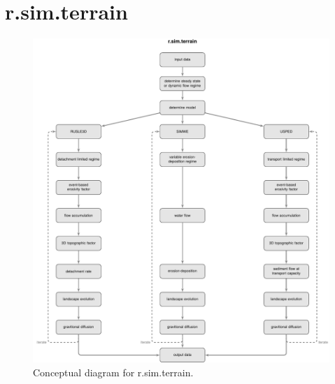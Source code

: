 \documentclass[gmd, manuscript]{copernicus}
\providecommand{\DIFadd}[1]{{\protect\color{blue} \sf #1}} %
\providecommand{\DIFaddbegin}{} %
\providecommand{\DIFaddFL}[1]{\DIFadd{#1}} %
\begin{document}
\section{r.sim.terrain}
\DIFaddbegin 


\begin{figure}%
\center
\includegraphics[width=\textwidth,keepaspectratio]{figures/concept.pdf}
\caption{\DIFaddFL{Conceptual diagram for r.sim.terrain.}}
\label{fig:evolution}
\end{figure}

\end{document}
